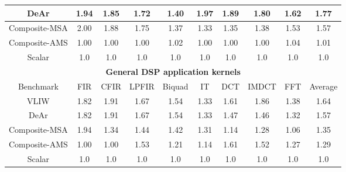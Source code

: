 {\begin{table}[!ht]
{\begin{tabular}{|c|c|c|c|c|c|c|c|c|c|}
                DeAr  &   1.94  &   1.85  &   1.72  &   1.40  &   1.97  &   1.89  &   1.80  &   1.62  &   1.77     \\ \hline
                Composite-MSA  &   2.00  &   1.88  &   1.75  &   1.37  &   1.33  &   1.35  &   1.38  &   1.53  &   1.57     \\ \hline 
                Composite-AMS  &   1.00  &   1.00  &   1.00  &   1.02  &   1.00  &   1.00  &   1.00  &   1.04  &   1.01     \\ \hline 
                Scalar  & 1.0  & 1.0  & 1.0  & 1.0  & 1.0  & 1.0  & 1.0  & 1.0  & 1.0 \\ \hline 
                \multicolumn{10}{|c|}{\textbf{General DSP application kernels}}                     \\ \hline
                Benchmark  &  FIR  &  CFIR  &  LPFIR  &  Biquad  &  IT  &  DCT  &  IMDCT  &  FFT  &  Average \\ \hline 
                VLIW  &   1.82  &   1.91  &   1.67  &   1.54  &   1.33  &   1.61  &   1.86  &   1.38  &   1.64     \\ \hline 
                DeAr  &   1.82  &   1.91  &   1.67  &   1.54  &   1.33  &   1.47  &   1.46  &   1.32  &   1.57     \\ \hline 
                Composite-MSA  &   1.94  &   1.34  &   1.44  &   1.42  &   1.31  &   1.14  &   1.28  &   1.06  &   1.35     \\ \hline 
                Composite-AMS  &   1.00  &   1.00  &   1.53  &   1.21  &   1.14  &   1.61  &   1.52  &   1.27  &   1.29     \\ \hline 
                Scalar  & 1.0  & 1.0  & 1.0  & 1.0  & 1.0  & 1.0  & 1.0  & 1.0  & 1.0 \\ \hline 
            \end{tabular}
        }
    \end{table}
}
